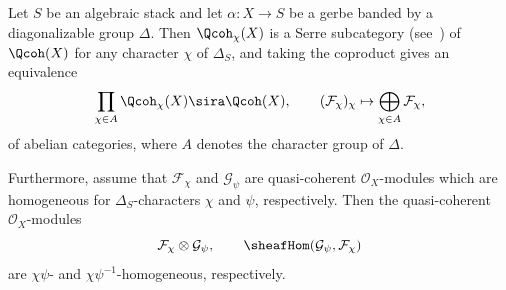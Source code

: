 \begin{theorem}
  \label{t-qc-gerbe-split}
  Let $S$ be an algebraic stack and let $\alpha\colon X \to S$ be a
  gerbe 
  banded by a diagonalizable group $\Delta$.
  Then $\Qcoh_\chi(X)$ is
  a Serre subcategory (see~\cite[]{stacks-project}) of $\Qcoh(X)$
  for any character $\chi$ of $\Delta_S$,
  and taking the coproduct gives an equivalence
  \begin{equation}
    \label{eq-eq-qc-gerbe}
    \prod_{\chi \in A}\Qcoh_\chi(X) \sira \Qcoh(X),
    \qquad
    (\mathcal{F}_\chi)_\chi \mapsto \bigoplus_{\chi \in A}
    \mathcal{F}_\chi, 
  \end{equation}
  of abelian categories, where $A$ denotes the character group of $\Delta$.
  
  Furthermore, assume that $\mathcal{F}_\chi$ and $\mathcal{G}_\psi$ are quasi-coherent
  $\mathcal{O}_X$-modules which are homogeneous for $\Delta_S$-characters $\chi$ and $\psi$, respectively.
  Then the quasi-coherent $\mathcal{O}_X$-modules
  \begin{equation}
    \label{eq-qc-monoidal}
    \mathcal{F}_\chi \otimes \mathcal{G}_\psi, \qquad
    \sheafHom(\mathcal{G}_\psi, \mathcal{F}_\chi)
  \end{equation}
  are $\chi\psi$- and $\chi\psi^{-1}$-homogeneous,
  respectively. 
\end{theorem}

